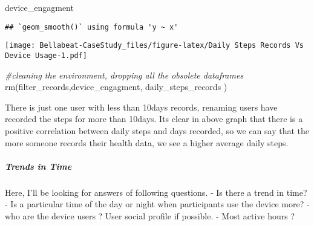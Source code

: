 \documentclass[
]{article}
\newenvironment{Shaded}{\begin{snugshade}}{\end{snugshade}}
\newcommand{\CommentTok}[1]{\textcolor[rgb]{0.56,0.35,0.01}{\textit{#1}}}
\newcommand{\FunctionTok}[1]{\textcolor[rgb]{0.00,0.00,0.00}{#1}}
\newcommand{\NormalTok}[1]{#1}
\begin{document}
\begin{Shaded}
\begin{Highlighting}[]
\NormalTok{device\_engagment}
\end{Highlighting}
\end{Shaded}

\begin{verbatim}
## `geom_smooth()` using formula 'y ~ x'
\end{verbatim}

\texttt{[image: Bellabeat-CaseStudy\_files/figure-latex/Daily Steps Records Vs Device Usage-1.pdf]}

\begin{Shaded}
\begin{Highlighting}[]
\CommentTok{\#cleaning the environment, dropping all the obsolete dataframes}
\FunctionTok{rm}\NormalTok{(filter\_records,device\_engagment, daily\_steps\_records )}
\end{Highlighting}
\end{Shaded}

There is just one user with less than 10days records, renaming users
have recorded the steps for more than 10days. Its clear in above graph
that there is a positive correlation between daily steps and days
recorded, so we can say that the more someone records their health data,
we see a higher average daily steps.

\hfill\break
\hfill\break

\hypertarget{trends-in-time}{%
\subparagraph{\texorpdfstring{\textbf{Trends in
Time}}{Trends in Time}}\label{trends-in-time}}

Here, I'll be looking for answers of following questions. - Is there a
trend in time? - Is a particular time of the day or night when
participants use the device more? - who are the device users ? User
social profile if possible. - Most active hours ?
\end{document}
